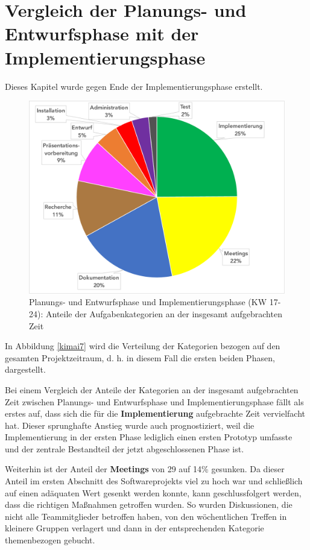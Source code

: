 \documentclass[../review_3.tex]{subfiles}
\begin{document}
\section{Vergleich der Planungs- und Entwurfsphase mit der Implementierungsphase}

Dieses Kapitel wurde gegen Ende der Implementierungsphase erstellt.

\begin{figure} [h]
    \centering
    \includegraphics[width = 0.9\linewidth]{img/kimai6.pdf}
    \caption{Planungs- und Entwurfsphase und Implementierungsphase (KW 17-24): Anteile der Aufgabenkategorien an der insgesamt aufgebrachten Zeit}
    \label{kimai6}
\end{figure}
In Abbildung \ref{kimai7} wird die Verteilung der Kategorien bezogen auf den gesamten Projektzeitraum, d. h. in diesem Fall die ersten beiden Phasen, dargestellt.

Bei einem Vergleich der Anteile der Kategorien an der insgesamt aufgebrachten Zeit zwischen Planungs- und Entwurfsphase und Implementierungsphase fällt als erstes auf, dass sich die für die \textbf{Implementierung} aufgebrachte Zeit vervielfacht hat. Dieser sprunghafte Anstieg wurde auch prognostiziert, weil die Implementierung in der ersten Phase lediglich einen ersten Prototyp umfasste und der zentrale Bestandteil der jetzt abgeschlossenen Phase ist.

Weiterhin ist der Anteil der \textbf{Meetings} von 29 auf 14\% gesunken. Da dieser Anteil im ersten Abschnitt des Softwareprojekts viel zu hoch war und schließlich auf einen adäquaten Wert gesenkt werden konnte, kann geschlussfolgert werden, dass die richtigen Maßnahmen getroffen wurden. So wurden Diskussionen, die nicht alle Teammitglieder betroffen haben, von den wöchentlichen Treffen in kleinere Gruppen verlagert und dann in der entsprechenden Kategorie themenbezogen gebucht.
\end{document}
